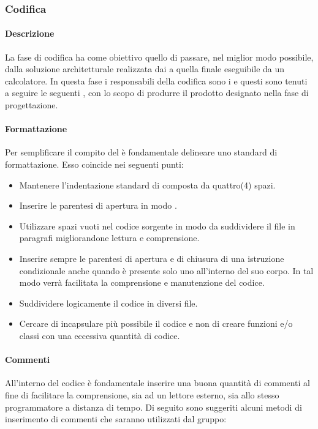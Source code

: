 \subsubsection{Codifica}
\paragraph{Descrizione}
La fase di codifica ha come obiettivo quello di passare, nel miglior modo possibile, dalla soluzione architetturale realizzata dai \textit{\ProgP} a quella finale eseguibile da un calcolatore.
In questa fase i responsabili della codifica sono i \textit{\ProgrP} e questi sono tenuti a seguire le seguenti , con lo scopo di produrre il prodotto designato nella fase di progettazione.

\paragraph{Formattazione}
Per semplificare il compito del \textit{\Progr} è fondamentale delineare uno standard di formattazione.
Esso coincide nei seguenti punti:

\begin{itemize}
\item Mantenere l'indentazione standard di  composta da quattro(4) spazi.

\item Inserire le parentesi di apertura in modo .

\item Utilizzare spazi vuoti nel codice sorgente in modo da suddividere il file in paragrafi migliorandone lettura e comprensione.

\item Inserire sempre le parentesi di apertura e di chiusura di una istruzione condizionale anche quando è presente solo uno  all'interno del suo corpo. In tal modo verrà facilitata la comprensione e manutenzione del codice.

\item Suddividere logicamente il codice in diversi file.

\item Cercare di incapsulare più possibile il codice e non di creare funzioni e/o classi con una eccessiva quantità di codice.
\end{itemize}

\paragraph{Commenti}
All'interno del codice è fondamentale inserire una buona quantità di commenti al fine di facilitare la comprensione, sia ad un lettore esterno, sia allo stesso programmatore a distanza di tempo.
Di seguito sono suggeriti alcuni metodi di inserimento di commenti che saranno utilizzati dal gruppo:

